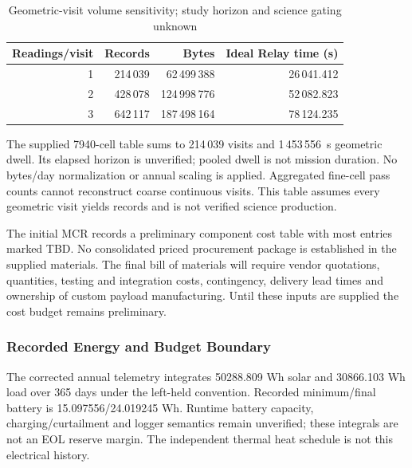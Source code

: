 \begin{table}[H]\centering\small
\caption{Geometric-visit volume sensitivity; study horizon and science gating unknown}\label{tab:grid-v3-volume}
\begin{tabular}{rrrr}\toprule Readings/visit & Records & Bytes & Ideal Relay time (s)\\\midrule
1 & 214\,039 & 62\,499\,388 & 26\,041.412\\
2 & 428\,078 & 124\,998\,776 & 52\,082.823\\
3 & 642\,117 & 187\,498\,164 & 78\,124.235\\\bottomrule\end{tabular}
\end{table}
The supplied 7940-cell table sums to 214\,039 visits and 1\,453\,556~s geometric dwell. Its elapsed horizon is unverified; pooled dwell is not mission duration. No bytes/day normalization or annual scaling is applied. Aggregated fine-cell pass counts cannot reconstruct coarse continuous visits. This table assumes every geometric visit yields records and is not verified science production.



The initial MCR records a preliminary component cost table with most entries marked TBD. No consolidated priced procurement package is established in the supplied materials. The final bill of materials will require vendor quotations, quantities, testing and integration costs, contingency, delivery lead times and ownership of custom payload manufacturing. Until these inputs are supplied the cost budget remains preliminary.

\subsubsection{Recorded Energy and Budget Boundary}
The corrected annual telemetry integrates 50288.809 Wh solar and 30866.103 Wh load over 365 days under the left-held convention. Recorded minimum/final battery is 15.097556/24.019245 Wh. Runtime battery capacity, charging/curtailment and logger semantics remain unverified; these integrals are not an EOL reserve margin. The independent thermal heat schedule is not this electrical history.
